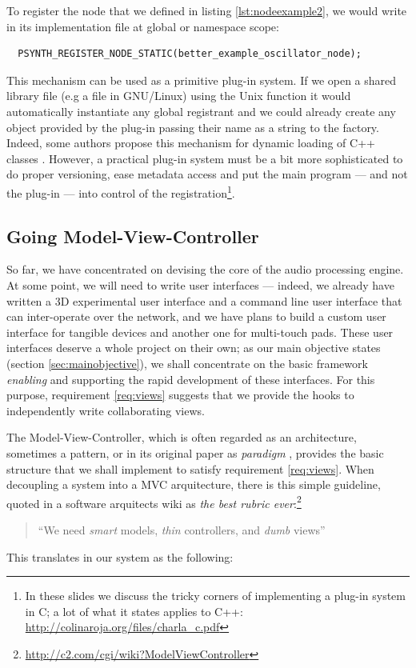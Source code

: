 To register the node that we defined in listing
\ref{lst:nodeexample2}, we would write in its 
implementation file at global or namespace scope:
\begin{lstlisting}
  PSYNTH_REGISTER_NODE_STATIC(better_example_oscillator_node);
\end{lstlisting}

This mechanism can be used as a primitive plug-in system. If we open a
shared library file (e.g a  file in GNU/Linux) using the
Unix  function it would automatically instantiate any
global registrant and we could already create any object provided by
the plug-in passing their name as a string to the factory. Indeed,
some authors propose this mechanism for dynamic loading of C++ classes
\cite{norton00dynamic, beveridge98self}. However, a practical plug-in
system must be a bit more sophisticated to do proper versioning, ease
metadata access and put the main program --- and not the plug-in ---
into control of the registration\footnote{In these slides we discuss
  the tricky corners of implementing a plug-in system in C; a lot of
  what it states applies to C++:
\url{http://colinaroja.org/files/charla_c.pdf}}.

\subsection{Going Model-View-Controller}
\label{sec:graphmvc}

So far, we have concentrated on devising the core of the audio
processing engine. At some point, we will need to write user
interfaces --- indeed, we already have written a 3D experimental user
interface and a command line user interface that can inter-operate
over the network, and we have plans to build a custom user interface
for tangible devices and another one for multi-touch pads. These user
interfaces deserve a whole project on their own; as our main
objective states (section \ref{sec:mainobjective}), we shall
concentrate on the basic framework \emph{enabling} and supporting the
rapid development of these interfaces. For this purpose, requirement
\ref{req:views} suggests that we provide the hooks to independently
write collaborating views.

The Model-View-Controller, which is
often regarded as an architecture, sometimes a pattern, or in its
original paper as \emph{paradigm} \cite{krasner88mvc}, provides the
basic structure that we shall implement to satisfy requirement
\ref{req:views}. When decoupling a system into a MVC arquitecture,
there is this simple guideline, quoted in a software arquitects wiki
as \emph{the best rubric
  ever}:\footnote{\url{http://c2.com/cgi/wiki?ModelViewController}}
\begin{quote}
  ``We need \emph{smart} models, \emph{thin} controllers, and
  \emph{dumb} views''
\end{quote}
This translates in our system as the following:

